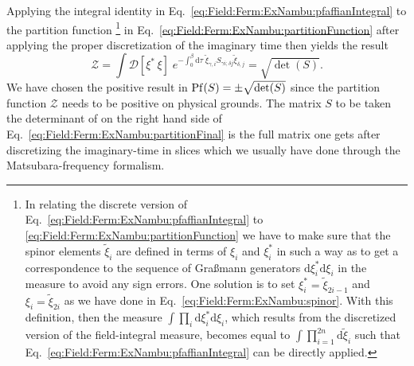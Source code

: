 Applying the integral identity in Eq.~\eqref{eq:Field:Ferm:ExNambu:pfaffianIntegral} to the partition function%
%
\footnote{In relating the discrete version of
Eq.~\eqref{eq:Field:Ferm:ExNambu:pfaffianIntegral} to \eqref{eq:Field:Ferm:ExNambu:partitionFunction} we have to make sure that the spinor elements $\tilde{\xi}_i$
are defined in terms of $\xi_i$ and $\xi_i^\ast$ in such a way as to get a correspondence to the sequence of Gra\ss mann
generators $\mathrm{d}\xi^\ast_i\mathrm{d}\xi_i$ in the measure to avoid any sign errors. One solution
is to set $\xi_i^\ast = \tilde{\xi}_{2i-1}$ and $\xi_i = \tilde{\xi}_{2i}$ as we have done in Eq.~\eqref{eq:Field:Ferm:ExNambu:spinor}. With this definition,
then the measure $\int\prod_i\mathrm{d}\xi_i^\ast\mathrm{d}\xi_i$, which results from the discretized version of the field-integral measure, becomes
equal to $\int\prod_{i=1}^{2n}\mathrm{d}\tilde{\xi}_i$ such that Eq.~\eqref{eq:Field:Ferm:ExNambu:pfaffianIntegral} can be directly applied.%
} %
%
in Eq.~\eqref{eq:Field:Ferm:ExNambu:partitionFunction}
after applying the proper discretization of the imaginary time then yields the result
\begin{equation}
    \label{eq:Field:Ferm:ExNambu:partitionFinal}
    \mathcal{Z} = \int\!\mathcal{D}[\xi^\ast\,\xi]\;e^{-\int_0^\beta\!\mathrm{d}\tau\;\tilde{\xi}_{\gamma,i}S_{\gamma i; \delta j}\tilde{\xi}_{\delta, j}} = \sqrt{\det(S)}.
\end{equation}
We have chosen the positive result in $\operatorname{Pf}(S) = \pm\sqrt{\det(S)}$ since the partition function $\mathcal{Z}$ needs to be positive on physical grounds.
The matrix $S$ to be taken the determinant of on the right hand side of Eq.~\eqref{eq:Field:Ferm:ExNambu:partitionFinal} is the full matrix one gets after
discretizing the imaginary-time in slices which we usually have done through the Matsubara-frequency formalism.

